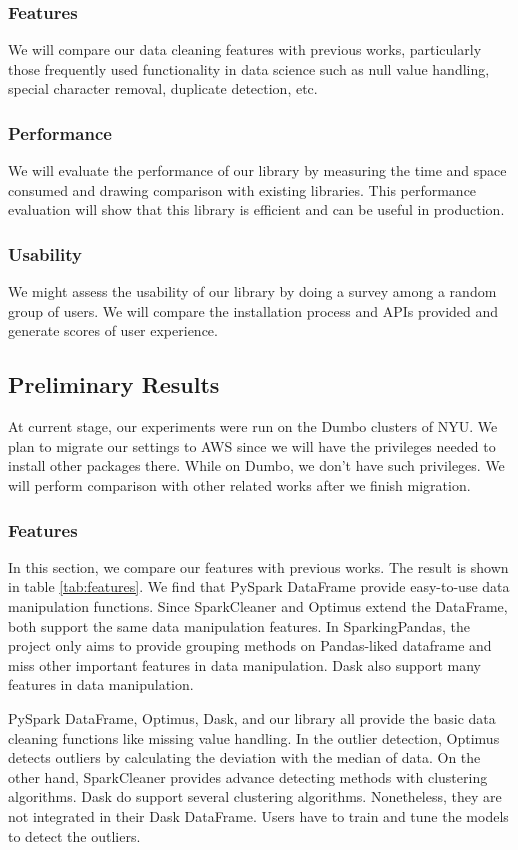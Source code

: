 \documentclass[sigconf]{acmart}
\begin{document}
\subsubsection{Features}
We will compare our data cleaning features with previous works, particularly those frequently used functionality in data science such as null value handling, special character removal, duplicate detection, etc. 
\subsubsection{Performance}
We will evaluate the performance of our library by measuring the time and space consumed and drawing comparison with existing libraries. This performance evaluation will show that this library is efficient and can be useful in production. 
\subsubsection{Usability}
We might assess the usability of our library by doing a survey among a random group of users. We will compare the installation process and APIs provided and generate scores of user experience.

\subsection{Preliminary Results}
At current stage, our experiments were run on the Dumbo clusters of NYU. We plan to migrate our settings to AWS since we will have the privileges needed to install other packages there. While on Dumbo, we don't have such privileges. We will perform comparison with other related works after we finish migration.

\subsubsection{Features}
In this section, we compare our features with previous works. The result is shown in table \ref{tab:features}. We find that PySpark DataFrame provide easy-to-use data manipulation functions. Since SparkCleaner and Optimus extend the DataFrame, both support the same data manipulation features. In SparkingPandas, the project only aims to provide grouping methods on Pandas-liked dataframe and miss other important features in data manipulation. Dask also support many features in data manipulation. 

PySpark DataFrame, Optimus, Dask, and our library all provide the basic data cleaning functions like missing value handling. In the outlier detection, Optimus detects outliers by calculating the deviation with the median of data. On the other hand, SparkCleaner provides advance detecting methods with clustering algorithms. Dask do support several clustering algorithms. Nonetheless, they are not integrated in their Dask DataFrame. Users have to train and tune the models to detect the outliers.
\end{document}

